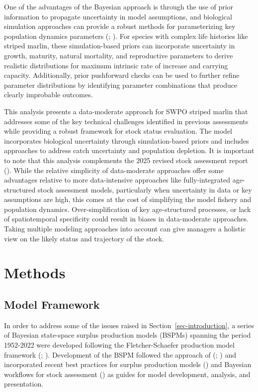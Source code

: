 \documentclass[
  11pt,
]{SCreport}
\begin{document}
One of the advantages of the Bayesian approach is through the use of
prior information to propagate uncertainty in model assumptions, and
biological simulation approaches can provide a robust methods for
parameterizing key population dynamics parameters
(;
). For species with
complex life histories like striped marlin, these simulation-based
priors can incorporate uncertainty in growth, maturity, natural
mortality, and reproductive parameters to derive realistic distributions
for maximum intrinsic rate of increase and carrying capacity.
Additionally, prior pushforward checks can be used to further refine
parameter distributions by identifying parameter combinations that
produce clearly improbable outcomes.

This analysis presents a data-moderate approach for SWPO striped marlin
that addresses some of the key technical challenges identified in
previous assessments while providing a robust framework for stock status
evaluation. The model incorporates biological uncertainty through
simulation-based priors and includes approaches to address catch
uncertainty and population depletion. It is important to note that this
analysis complements the 2025 revised stock assessment report
(). While the relative simplicity of data-moderate approaches offer
some advantages relative to more data-intensive approaches like
fully-integrated age-structured stock assessment models, particularly
when uncertainty in data or key assumptions are high, this comes at the
cost of simplifying the model fishery and population dynamics.
Over-simplification of key age-structured processes, or lack of
spatiotemporal specificity could result in biases in data-moderate
approaches. Taking multiple modeling approaches into account can give
managers a holistic view on the likely status and trajectory of the
stock.

\section{Methods}\label{sec-methods}

\subsection{Model Framework}\label{sec-model-framework}

In order to address some of the issues raised in
Section~\ref{sec-introduction}, a series of Bayesian state-space surplus
production models (BSPMs) spanning the period 1952-2022 were developed
following the Fletcher-Schaefer production model framework
(;
). Development
of the BSPM followed the approach of (; )
and incorporated recent best practices for surplus production models
() and Bayesian
workflows for stock assessment
() as guides for
model development, analysis, and presentation.
\end{document}
